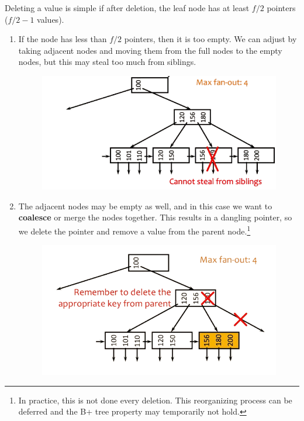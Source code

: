 \documentclass{article}
\begin{document}
      \begin{algo}[Deletion]
        Deleting a value is simple if after deletion, the leaf node has at least $f/2$ pointers ($f/2 - 1$ values). 
        
        \begin{enumerate}
          \item If the node has less than $f/2$ pointers, then it is too empty. We can adjust by taking adjacent nodes and moving them from the full nodes to the empty nodes, but this may steal too much from siblings. 

          \begin{figure}[H]
            \centering 
            \includegraphics[scale=0.4]{img/deletion_1.png}
            \caption{} 
            \label{fig:deletion_1}
          \end{figure}

          \item The adjacent nodes may be empty as well, and in this case we want to \textbf{coalesce} or merge the nodes together. This results in a dangling pointer, so we delete the pointer and remove a value from the parent node.\footnote{In practice, this is not done every deletion. This reorganizing process can be deferred and the B+ tree property may temporarily not hold.} 

          \begin{figure}[H]
            \centering 
            \includegraphics[scale=0.4]{img/deletion_2.png}
            \caption{} 
            \label{fig:deletion_2}
          \end{figure}


\end{enumerate}
\end{algo}
\end{document}

